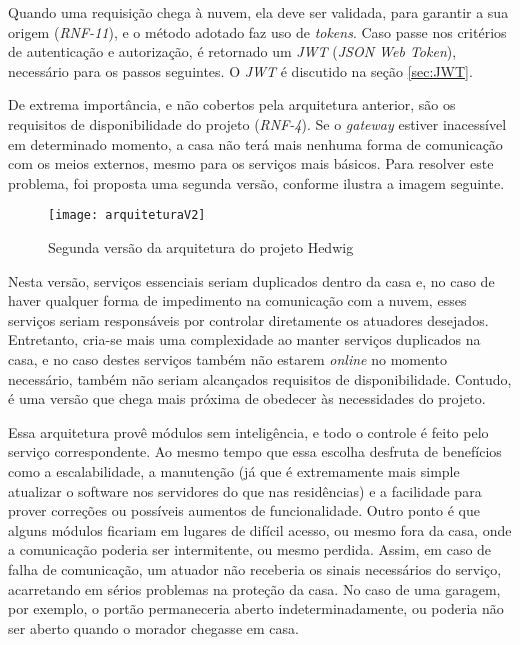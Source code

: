Quando uma requisição chega à nuvem, ela deve ser validada, para garantir a sua origem (\emph{RNF-11}), e o método adotado faz uso de \emph{tokens}.  Caso passe nos critérios de autenticação e autorização, é retornado um \emph{JWT} (\textit{JSON Web Token}), necessário para os passos seguintes. O \emph{JWT} é discutido na seção \ref{sec:JWT}. %

De extrema importância, e não cobertos pela arquitetura anterior, são os requisitos de disponibilidade do projeto (\emph{RNF-4}). Se o \textit{gateway} estiver inacessível em determinado momento, a casa não terá mais nenhuma forma de comunicação com os meios externos, mesmo para os serviços mais básicos. Para resolver este problema, foi proposta uma segunda versão, conforme ilustra a imagem seguinte.

\begin{figure}[H]
	\centering
	\caption{Segunda versão da arquitetura do projeto Hedwig}
  \texttt{[image: arquiteturaV2]}
\label{fig:arquiteturaV2}
\end{figure}

Nesta versão, serviços essenciais seriam duplicados dentro da casa e, no caso de haver qualquer forma de impedimento na comunicação com a nuvem, esses serviços seriam responsáveis por controlar diretamente os atuadores desejados. Entretanto, cria-se mais uma complexidade ao manter serviços duplicados na casa, e no caso destes serviços também não estarem \emph{online} no momento necessário, também não seriam alcançados requisitos de disponibilidade. Contudo, é uma versão que chega mais próxima de obedecer às necessidades do projeto.

Essa arquitetura provê módulos sem inteligência, e todo o controle é feito pelo serviço correspondente. Ao mesmo tempo que essa escolha desfruta de benefícios como a escalabilidade, a manutenção (já que é extremamente mais simple atualizar o software nos servidores do que nas residências) e a facilidade para prover correções ou possíveis aumentos de funcionalidade. Outro ponto é que alguns módulos ficariam em lugares de difícil acesso, ou mesmo fora da casa, onde a comunicação poderia ser intermitente, ou mesmo perdida. Assim, em caso de falha de comunicação, um atuador não receberia os sinais necessários do serviço, acarretando em sérios problemas na proteção da casa. No caso de uma garagem, por exemplo, o portão permaneceria aberto indeterminadamente, ou poderia não ser aberto quando o morador chegasse em casa.

